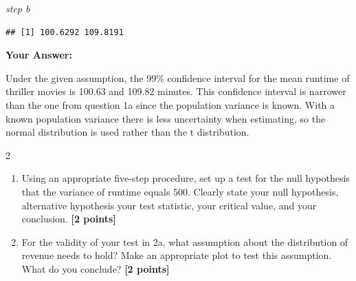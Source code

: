 \documentclass[
]{article}
\newenvironment{Shaded}{\begin{snugshade}}{\end{snugshade}}
\newcommand{\FloatTok}[1]{\textcolor[rgb]{0.00,0.00,0.81}{#1}}
\newcommand{\FunctionTok}[1]{\textcolor[rgb]{0.13,0.29,0.53}{\textbf{#1}}}
\newcommand{\NormalTok}[1]{#1}
\newcommand{\OtherTok}[1]{\textcolor[rgb]{0.56,0.35,0.01}{#1}}
\newcommand{\SpecialCharTok}[1]{\textcolor[rgb]{0.81,0.36,0.00}{\textbf{#1}}}
\providecommand{\tightlist}{%
  \setlength{\itemsep}{0pt}\setlength{\parskip}{0pt}}
\begin{document}
\emph{step b}

\begin{Shaded}
\end{Shaded}

\begin{verbatim}
## [1] 100.6292 109.8191
\end{verbatim}

\textbf{Your Answer:}

Under the given assumption, the 99\% confidence interval for the mean
runtime of thriller movies is 100.63 and 109.82 minutes. This confidence
interval is narrower than the one from question 1a since the population
variance is known. With a known population variance there is less
uncertainty when estimating, so the normal distribution is used rather
than the t distribution.

2

\begin{enumerate}
\def\labelenumi{\alph{enumi}.}
\tightlist
\item
  Using an appropriate five-step procedure, set up a test for the null
  hypothesis that the variance of runtime equals \(500\). Clearly state
  your null hypothesis, alternative hypothesis your test statistic, your
  critical value, and your conclusion. \textbf{[2 points]}
\item
  For the validity of your test in 2a, what assumption about the
  distribution of revenue needs to hold? Make an appropriate plot to
  test this assumption. What do you conclude? \textbf{[2 points]}
\end{enumerate}
\end{document}
